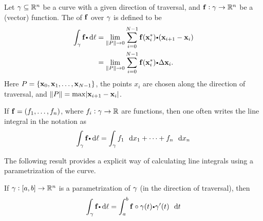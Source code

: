   \begin{definition}
    Let $\gamma \subseteq \mathbb{R}^n$ be a curve with a given direction of traversal, and $\mathbf{ f}:\gamma \to \mathbb{R}^n$ be a (vector) function.
    The  of $\mathbf{ f}$ over $\gamma$ is defined to be
    \begin{align*}
      \dint_\caminho \funvect{f} \bp \dif \ell &= \lim_{\norm{P} \to 0}
	\sum_{i = 0}^{N-1} \funvect{f}(  \vector{x}_i^* ) \bp (  \vector{x}_{i+1} 
-  \vector{x}_i )\\
&=\lim_{\norm{P} \to 0}
	\sum_{i = 0}^{N-1} \funvect{f}(  \vector{x}_i^* ) \bp \Delta\vector{x}_i .
    \end{align*}
    Here $P = \set{ \mathbf{ x}_0,  \mathbf{ x}_1, \dots,  \mathbf{ x}_{N-1}}$, 
the points $x_i$ are chosen along the direction of traversal, and ${\left\|P\right\|} = 
\max \abs{ \mathbf{ x}_{i+1} -  \mathbf{ x}_i}$.
  \end{definition}
  
  
 


  

  \begin{remark}
    If $\mathbf{ f} = (f_1, \dots, f_n)$, where $f_i:\gamma \to \mathbb{R}$ are functions, then one often writes the line integral in the  notation as
    \begin{equation*}
      \dint_\caminho \funvect{f} \bp \dif \ell
	= \dint_\caminho f_1 \, \dx_1 + \cdots + f_n \, \dx_n
    \end{equation*}
  \end{remark}
  
  The following result provides a explicit way of calculating line integrals using a parametrization of the curve.
  
    \begin{thm}\label{ppnLineIntParam}
    If $\gamma:[a, b] \to \mathbb{R}^n$ is a parametrization of $\gamma$ (in the direction of traversal), then
    \begin{equation}\label{eqnLineIntDef}
      \dint_\caminho \funvect{f} \bp \dif \ell = \dint_a^b \funvect{f} \circ \gamma(t) \bp \gamma'(t) \, \dt
    \end{equation}
  \end{thm}

